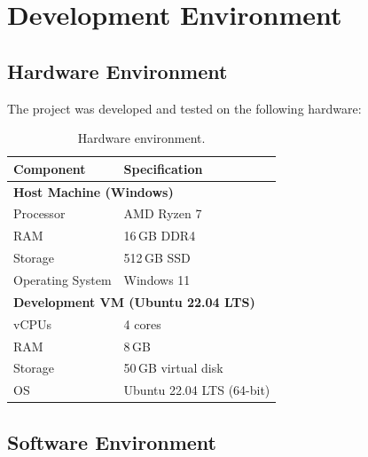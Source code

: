 \section{Development Environment}
\label{sec:environment}

\subsection{Hardware Environment}

The project was developed and tested on the following hardware:

\begin{table}[H]
\centering
\begin{tabularx}{\textwidth}{|l|X|}
\hline
\textbf{Component} & \textbf{Specification} \\
\hline
\multicolumn{2}{|l|}{\textbf{Host Machine (Windows)}} \\
\hline
Processor & AMD Ryzen 7 \\
\hline
RAM & 16\,GB DDR4 \\
\hline
Storage & 512\,GB SSD \\
\hline
Operating System & Windows 11 \\
\hline
\multicolumn{2}{|l|}{\textbf{Development VM (Ubuntu 22.04 LTS)}} \\
\hline
vCPUs & 4 cores \\
\hline
RAM & 8\,GB \\
\hline
Storage & 50\,GB virtual disk \\
\hline
OS & Ubuntu 22.04 LTS (64-bit) \\
\hline
\end{tabularx}
\caption{Hardware environment.}
\label{tab:hardware}
\end{table}

\subsection{Software Environment}

